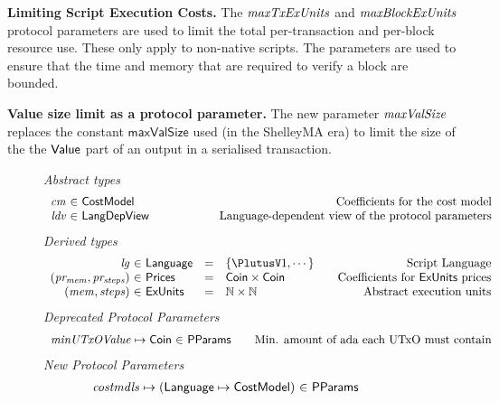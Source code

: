 \textbf{Limiting Script Execution Costs.}
The $\mathit{maxTxExUnits}$ and $\mathit{maxBlockExUnits}$ protocol parameters are
used to limit the total per-transaction and per-block resource use. These only apply to non-native scripts.
The parameters are used to ensure that the time and memory that are required to verify a block are bounded.

\textbf{Value size limit as a protocol parameter.}
The new parameter $\mathit{maxValSize}$ replaces the constant $\mathsf{maxValSize}$
used (in the ShelleyMA era) to limit the size of the the $\mathsf{Value}$ part of an output in a
serialised transaction.

\begin{figure*}[htb]
  \emph{Abstract types}
  \begin{equation*}
    \begin{array}{r@{~\in~}l@{\qquad\qquad\qquad}r}
      \var{cm} & \CostMod & \text{Coefficients for the cost model} \\
      \var{ldv} & \LangDepView & \text{Language-dependent view of the protocol parameters}
    \end{array}
  \end{equation*}
  \emph{Derived types}
  \begin{equation*}
    \begin{array}{r@{~\in~}l@{\quad=\quad}l@{\qquad}r}
      \var{lg}
      & \Language
      & \{\PlutusV1, \dotsb\}
      & \text{Script Language}
      \\
      \var{(pr_{mem}, pr_{steps})}
      & \Prices
      & \Coin \times \Coin
      & \text {Coefficients for $\ExUnits$ prices}
      \\
      \var{(mem, steps)}
      & \ExUnits
      & \N \times \N
      & \text{Abstract execution units} \\
    \end{array}
  \end{equation*}
  \emph{Deprecated Protocol Parameters}
  \begin{equation*}
      \begin{array}{r@{~\in~}l@{\qquad}r}
        \var{minUTxOValue} \mapsto \Coin & \PParams & \text{Min. amount of ada each UTxO must contain}
      \end{array}
  \end{equation*}
  \emph{New Protocol Parameters}
  \begin{equation*}
      \begin{array}{r@{~\in~}l@{\qquad}r}
        \var{costmdls} \mapsto (\Language \mapsto \CostMod) & \PParams \\

\end{array}
\end{equation*}
\end{figure*}
